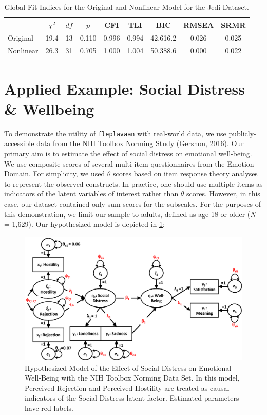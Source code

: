 \documentclass[
  english,
  doc]{apa6}
\begin{document}
\begin{table}[tbp]

\begin{center}
\begin{threeparttable}

\caption{\label{tab:tabresults}Global Fit Indices for the Original and Nonlinear Model for the Jedi Dataset.}

\begin{tabular}{lcccccccc}
\toprule
 & $\chi^2$ & $df$ & $p$ & CFI & TLI & BIC & RMSEA & SRMR\\
\midrule
Original & 19.4 & 13 & 0.110 & 0.996 & 0.994 & 42,616.2 & 0.026 & 0.025\\
Nonlinear & 26.3 & 31 & 0.705 & 1.000 & 1.004 & 50,388.6 & 0.000 & 0.022\\
\bottomrule
\end{tabular}

\end{threeparttable}
\end{center}

\end{table}

\hypertarget{applied-example-social-distress-wellbeing}{%
\section{Applied Example: Social Distress \& Wellbeing}\label{applied-example-social-distress-wellbeing}}

To demonstrate the utility of \texttt{fleplavaan} with real-world data, we use publicly-accessible data from the NIH Toolbox Norming Study (Gershon, 2016). Our primary aim is to estimate the effect of social distress on emotional well-being. We use composite scores of several multi-item questionnaires from the Emotion Domain. For simplicity, we used \(\theta\) scores based on item response theory analyses to represent the observed constructs. In practice, one should use multiple items as indicators of the latent variables of interest rather than \(\theta\) scores. However, in this case, our dataset contained only sum scores for the subscales. For the purposes of this demonstration, we limit our sample to adults, defined as age 18 or older (\emph{N} = 1,629). Our hypothesized model is depicted in \ref{fig:toolbox1}:

\begin{figure}

{\centering \includegraphics[width=0.25\linewidth]{toolboxDiagramPrimary} 

}

\caption{Hypothesized Model of the Effect of Social Distress on Emotional Well-Being with the NIH Toolbox Norming Data Set. In this model, Perceived Rejection and Perceived Hostility are treated as causal indicators of the Social Distress latent factor. Estimated parameters have red labels.}\label{fig:toolbox1}
\end{figure}
\end{document}
